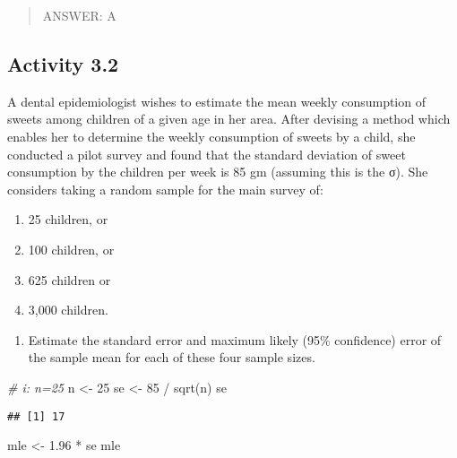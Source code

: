 \documentclass[
]{memoir}
\newenvironment{Shaded}{\begin{snugshade}}{\end{snugshade}}
\newcommand{\CommentTok}[1]{\textcolor[rgb]{0.56,0.35,0.01}{\textit{#1}}}
\newcommand{\DecValTok}[1]{\textcolor[rgb]{0.00,0.00,0.81}{#1}}
\newcommand{\FloatTok}[1]{\textcolor[rgb]{0.00,0.00,0.81}{#1}}
\newcommand{\FunctionTok}[1]{\textcolor[rgb]{0.00,0.00,0.00}{#1}}
\newcommand{\NormalTok}[1]{#1}
\newcommand{\OtherTok}[1]{\textcolor[rgb]{0.56,0.35,0.01}{#1}}
\newcommand{\SpecialCharTok}[1]{\textcolor[rgb]{0.00,0.00,0.00}{#1}}
\providecommand{\tightlist}{%
  \setlength{\itemsep}{0pt}\setlength{\parskip}{0pt}}
\begin{document}
\begin{quote}
ANSWER: A
\end{quote}

\hypertarget{activity-3.2}{%
\subsection*{Activity 3.2}\label{activity-3.2}}

A dental epidemiologist wishes to estimate the mean weekly consumption of sweets among children of a given age in her area. After devising a method which enables her to determine the weekly consumption of sweets by a child, she conducted a pilot survey and found that the standard deviation of sweet consumption by the children per week is 85 gm (assuming this is the σ). She considers taking a random sample for the main survey of:

\begin{enumerate}
\def\labelenumi{\roman{enumi})}
\tightlist
\item
  25 children, or
\item
  100 children, or
\item
  625 children or
\item
  3,000 children.
\end{enumerate}

\begin{enumerate}
\def\labelenumi{\alph{enumi})}
\tightlist
\item
  Estimate the standard error and maximum likely (95\% confidence) error of the sample mean for each of these four sample sizes.
\end{enumerate}

\begin{Shaded}
\begin{Highlighting}[]
\CommentTok{\# i: n=25}
\NormalTok{n }\OtherTok{\textless{}{-}} \DecValTok{25}
\NormalTok{se }\OtherTok{\textless{}{-}} \DecValTok{85} \SpecialCharTok{/} \FunctionTok{sqrt}\NormalTok{(n)}
\NormalTok{se}
\end{Highlighting}
\end{Shaded}

\begin{verbatim}
## [1] 17
\end{verbatim}

\begin{Shaded}
\begin{Highlighting}[]
\NormalTok{mle }\OtherTok{\textless{}{-}} \FloatTok{1.96} \SpecialCharTok{*}\NormalTok{ se}
\NormalTok{mle}
\end{Highlighting}
\end{Shaded}
\end{document}
